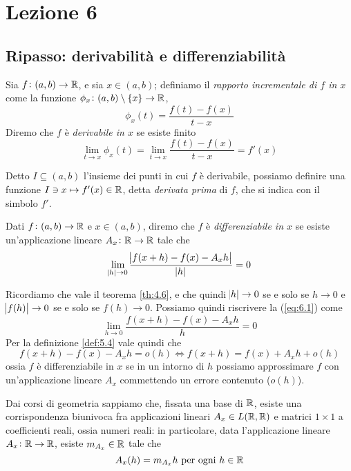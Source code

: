 \section{Lezione 6}
\subsection{Ripasso: derivabilità e differenziabilità}
\begin{definition}
    \label{def:6.1}
    Sia $f\colon(a,b)\to\amsbb{R}$, e sia $x\in(a,b)$; definiamo il \emph{rapporto incrementale di $f$ in $x$} come la funzione $\phi_x \colon (a,b) \setminus \{x\} \to \amsbb{R}$,
    \[
    \phi_x(t) = \frac{f(t)-f(x)}{t-x}
    \]
    Diremo che $f$ è \emph{derivabile in $x$} se esiste finito
    \begin{equation}
        \label{eq:6.1}
        \lim_{t\to x} \phi_x(t) = \lim_{t\to x} \frac{f(t)-f(x)}{t-x} = f'(x)
    \end{equation}
\end{definition}
\begin{remark}
    Detto $I\subseteq (a,b)$ l'insieme dei punti in cui $f$ è derivabile, possiamo definire una funzione $ I\ni x \mapsto f'(x)\in \amsbb{R}$, detta \emph{derivata prima} di $f$, che si indica con il simbolo $f'$.
\end{remark}
\begin{definition}
    \label{def:6.2}
    Dati $f\colon(a,b)\to\amsbb{R}$ e $x\in(a,b)$, diremo che $f$ è \emph{differenziabile in $x$} se esiste un'applicazione lineare $A_x\colon\amsbb{R}\to \amsbb{R}$ tale che
    \begin{equation}
        \label{eq:6.2}
        \lim_{\abs{h}\to0}\frac{\abs{f(x+h)-f(x)-A_x h}}{\abs{h}}=0
    \end{equation}
\end{definition}
\begin{remark}
    Ricordiamo che vale il teorema \ref{th:4.6}, e che quindi $\abs{h}\to 0$ se e solo se $h\to0$ e $\abs{f(h)}\to0$ se e solo se $f(h)\to0$. Possiamo quindi riscrivere la (\ref{eq:6.1}) come
    \[
    \lim_{h\to 0} \frac{f(x+h)-f(x)-A_x h}{h}=0
    \]
    Per la definizione \ref{def:5.4} vale quindi che
    \[
    f(x+h)-f(x)-A_xh = o(h) \iff f(x+h) = f(x) + A_x h+o(h)
    \]
    ossia $f$ è differenziabile in $x$ se in un intorno di $h$ possiamo approssimare $f$ con un'applicazione lineare $A_x$ commettendo un errore contenuto ($o(h)$).
\end{remark}
\begin{remark}
    Dai corsi di geometria sappiamo che, fissata una base di $\amsbb{R}$, esiste una corrispondenza biunivoca fra applicazioni lineari $A_x\in L(\amsbb{R}, \amsbb{R})$ e matrici $1\times 1$ a coefficienti reali, ossia numeri reali: in particolare, data l'applicazione lineare $A_x\colon \amsbb{R}\to\amsbb{R}$, esiste $m_{A_x}\in\amsbb{R}$ tale che
    \[
    A_x(h) = m_{A_x}h \ \text{per ogni} \ h\in\amsbb{R}
    \]
\end{remark}
